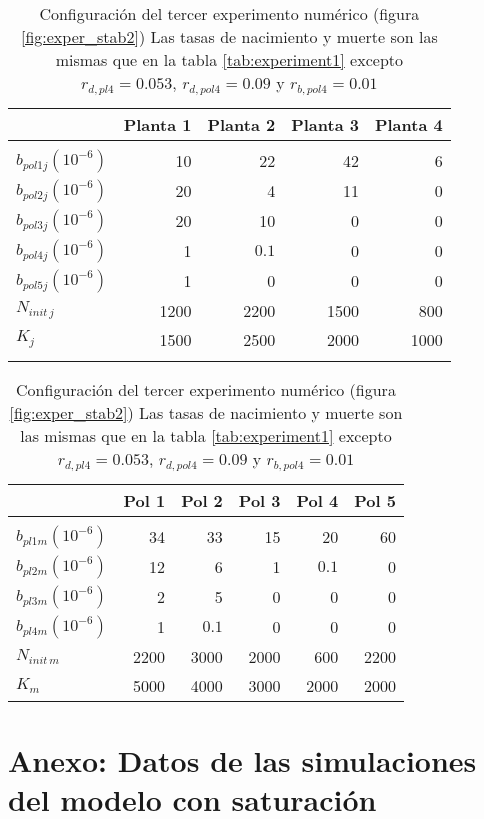 \begin{table}[h!]
\centering
\footnotesize
\begin{tabular}{lrrrr}
\hline
 & Planta 1 & Planta 2 & Planta 3 & Planta 4  \\
\hline
\\
$b_{pol1j}\left(10^{-6}\right)$ & 10 & 22 & 42 & 6 \\
$b_{pol2j}\left(10^{-6}\right)$ & 20 & 4 & 11 & 0 \\
$b_{pol3j}\left(10^{-6}\right)$ & 20 & 10 & 0 & 0 \\
$b_{pol4j}\left(10^{-6}\right)$ & 1 & $0.1 $ & 0 & 0 \\
$b_{pol5j}\left(10^{-6}\right)$ & 1 & 0 & 0 & 0 \\
$N_{init\,j}$ & 1200 & 2200 & 1500 & 800 \\
$K_{j}$ & 1500 & 2500 & 2000 & 1000 \\

\hline
\\
\end{tabular}

\begin{tabular}{lrrrrr}
\hline
 &Pol 1&Pol 2&Pol 3&Pol 4&Pol 5\\
\hline
\\
$b_{pl1m}\left(10^{-6}\right)$ & 34 & 33 & 15 & 20 & 60\\
$b_{pl2m}\left(10^{-6}\right)$ & 12 & 6 & 1 & $0.1$ & 0\\
$b_{pl3m}\left(10^{-6}\right)$ & 2 & 5 & 0 & 0 & 0\\
$b_{pl4m}\left(10^{-6}\right)$ & 1 & $0.1$ & 0 & 0 & 0\\
$N_{init\,m}$ & 2200 & 3000 & 2000 & 600 & 2200 \\
$K_{m}$& 5000 & 4000 & 3000 & 2000 & 2000\\
\hline
\end{tabular}
\normalsize
\caption{Configuración del tercer experimento numérico (figura \ref{fig:exper_stab2})  Las tasas de nacimiento y muerte son las mismas que en la tabla \ref{tab:experiment1} excepto  $r_{d,pl4}=0.053$, $r_{d,pol4}=0.09$ y $r_{b,pol4}=0.01$}
\label{tab:experiment3}
\end{table}

\section{Anexo: Datos de las simulaciones del modelo con saturación}
\label{DINAMICA_ANEXO_saturacion}


